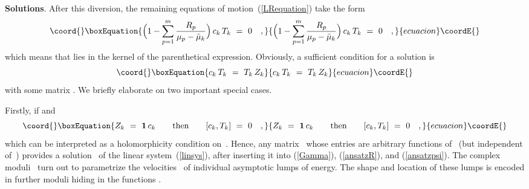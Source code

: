 \documentclass[a4paper,11pt]{article}
\numberwithin{equation}{section}
\begin{document}
\noindent
{\bf Solutions}.
After this diversion, the remaining equations of motion~(\ref{LRequation})
take the form
\begin{equation}\coord{}\boxEquation{ \label{eom}
\Bigl(1-\sum_{p=1}^m\frac{R_p}{\mu_p-\bar{\mu}_k}\Bigr)\,c_k\,T_k\ =\ 0\quad,
}{ \Bigl(1-\sum_{p=1}^m\frac{R_p}{\mu_p-\bar{\mu}_k}\Bigr)\,c_k\,T_k\ =\ 0\quad,
}{ecuacion}\coordE{}\end{equation}
which means that \coordHE{} lies in the kernel of the parenthetical expression.
Obviously, a sufficient condition for a solution is
\begin{equation}\coord{}\boxEquation{ \label{holT}
c_k\,T_k\ =\ T_k\,Z_k
}{ c_k\,T_k\ =\ T_k\,Z_k
}{ecuacion}\coordE{}\end{equation}
with some \coordHE{} matrix \coordHE{}.
We briefly elaborate on two important special cases.

Firstly, if \coordHE{} and
\begin{equation}\coord{}\boxEquation{
Z_k\ =\ {\bf1}\,c_k \qquad\textrm{then}\qquad [c_k,T_k]\ =\ 0 \quad,
}{
Z_k\ =\ {\bf1}\,c_k \qquad\textrm{then}\qquad [c_k,T_k]\ =\ 0 \quad,
}{ecuacion}\coordE{}\end{equation}
which can be interpreted as a holomorphicity condition on~\coordHE{}.
Hence, any \coordHE{} matrix~\coordHE{} whose entries are arbitrary functions
of~\coordHE{} (but independent of~\coordHE{}) provides a solution~\myHighlight{$\psi$}\coordHE{} of the
linear system~(\ref{linsys}), after inserting it into (\ref{Gamma}),
(\ref{ansatzR}), and (\ref{ansatzpsi}). The complex moduli~\coordHE{} turn
out to parametrize the velocities~\coordHE{} of individual asymptotic
lumps of energy. The shape and location of these lumps is encoded
in further moduli hiding in the functions \coordHE{}.
\end{document}
